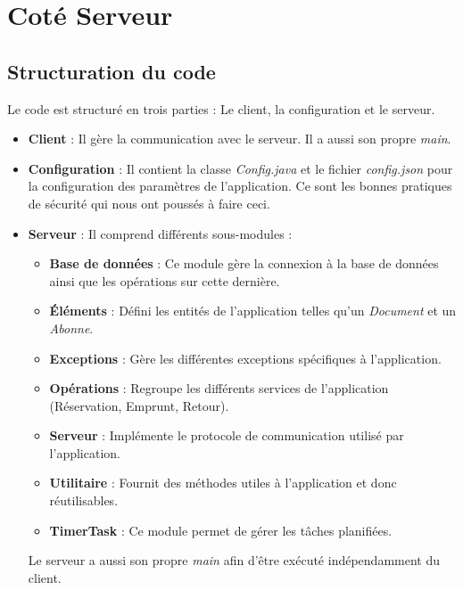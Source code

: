 \chapter*{Coté Serveur}

    \section{Structuration du code}

    Le code est structuré en trois parties : Le client, la configuration et le serveur.

    \bigskip

    \begin{itemize}
        \item \textbf{Client} : Il gère la communication avec le serveur. Il a aussi son propre \textit{main}.
        \item \textbf{Configuration} : Il contient la classe \textit{Config.java} et le fichier \textit{config.json} pour la configuration des paramètres de l'application. Ce sont les bonnes pratiques de sécurité qui nous ont poussés à faire ceci.
        \item \textbf{Serveur} : Il comprend différents sous-modules :
        \begin{itemize}
            \item \textbf{Base de données} : Ce module gère la connexion à la base de données ainsi que les opérations sur cette dernière.
            \item \textbf{Éléments} : Défini les entités de l’application telles qu’un \textit{Document} et un \textit{Abonne}.
            \item \textbf{Exceptions} : Gère les différentes exceptions spécifiques à l’application.
            \item \textbf{Opérations} : Regroupe les différents services de l’application (Réservation, Emprunt, Retour).
            \item \textbf{Serveur} : Implémente le protocole de communication utilisé par l’application.
            \item \textbf{Utilitaire} : Fournit des méthodes utiles à l’application et donc réutilisables.
            \item \textbf{TimerTask} : Ce module permet de gérer les tâches planifiées.
        \end{itemize}
        Le serveur a aussi son propre \textit{main} afin d'être exécuté indépendamment du client.
    \end{itemize}

